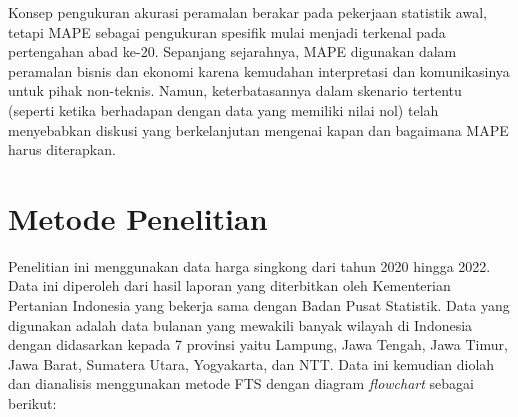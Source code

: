 \documentclass[conference]{IEEEtran}
\begin{document}
Konsep pengukuran akurasi peramalan berakar pada pekerjaan statistik awal, tetapi MAPE sebagai pengukuran spesifik mulai menjadi terkenal pada pertengahan abad ke-20. Sepanjang sejarahnya, MAPE digunakan dalam peramalan bisnis dan ekonomi karena kemudahan interpretasi dan komunikasinya untuk pihak non-teknis. Namun, keterbatasannya dalam skenario tertentu (seperti ketika berhadapan dengan data yang memiliki nilai nol) telah menyebabkan diskusi yang berkelanjutan mengenai kapan dan bagaimana MAPE harus diterapkan.



\section{Metode Penelitian}

Penelitian ini menggunakan data harga singkong dari tahun 2020 hingga 2022. Data ini diperoleh dari hasil laporan yang diterbitkan oleh Kementerian Pertanian Indonesia yang bekerja sama dengan Badan Pusat Statistik. Data yang digunakan adalah data bulanan yang mewakili banyak wilayah di Indonesia dengan didasarkan kepada 7 provinsi yaitu Lampung, Jawa Tengah, Jawa Timur, Jawa Barat, Sumatera Utara, Yogyakarta, dan NTT. Data ini kemudian diolah dan dianalisis menggunakan metode FTS dengan diagram \textit{flowchart} sebagai berikut:
\end{document}
